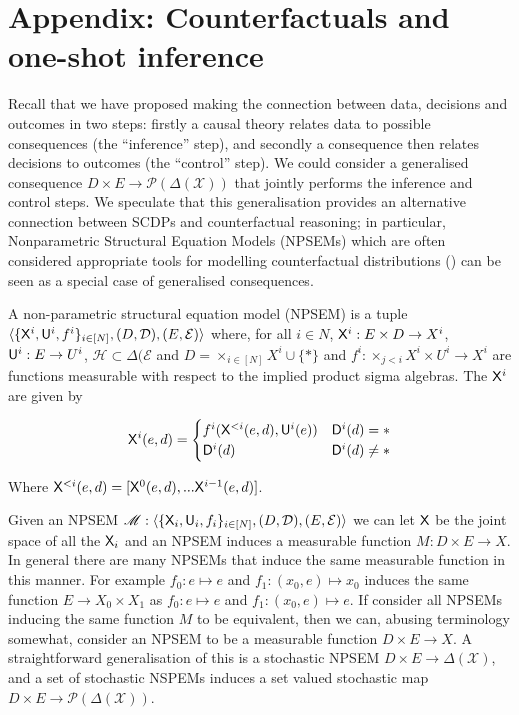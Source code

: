 \section{Appendix: Counterfactuals and one-shot inference}

Recall that we have proposed making the connection between data, decisions and outcomes in two steps: firstly a causal theory relates data to possible consequences (the ``inference'' step), and secondly a consequence then relates decisions to outcomes (the ``control'' step). We could consider a generalised consequence $D\times E\to \mathscr{P}(\Delta(\mathcal{X}))$ that jointly performs the inference and control steps. We speculate that this generalisation provides an alternative connection between SCDPs and counterfactual reasoning; in particular, Nonparametric Structural Equation Models (NPSEMs) which are often considered appropriate tools for modelling counterfactual distributions (\cite{pearl_causality:_2009,richardson2013single}) can be seen as a special case of generalised consequences.

\begin{definition}[NPSEM]\label{def:NPSEM}
A non-parametric structural equation model (NPSEM) is a tuple $\langle \{\mathsf{X}^i, \mathsf{U}^i, f^i\}_{i\in[N]}, (D,\mathcal{D}), (E,\mathcal{E})\rangle$ where, for all $i\in N$, $\mathsf{X}^i:E\times D \to X^i$, $\mathsf{U}^i:E\to U^i$, $\mathscr{H}\subset\Delta(\mathcal{E}$ and $D=\times_{i\in[N]} X^i\cup\{*\}$ and $f^i:\times_{j<i} X^i\times U^i\to X^i$ are functions measurable with respect to the implied product sigma algebras. The $\mathsf{X}^i$ are given by

\begin{align}
    \mathsf{X}^i(e,d) = \begin{cases} f^i(\mathsf{X}^{<i}(e,d),\mathsf{U}^i(e)) &\mathsf{D}^i(d)=*\\ 
    \mathsf{D}^i(d)  &\mathsf{D}^i(d)\neq * \end{cases}
\end{align}

Where $\mathsf{X}^{<i}(e,d)=[\mathsf{X}^0(e,d),...\mathsf{X}^{i-1}(e,d)]$.
\end{definition}

Given an NPSEM $\mathscr{M}:\langle \{\mathsf{X}_i, \mathsf{U}_i, f_i\}_{i\in[N]}, (D,\mathcal{D}), (E,\mathcal{E})\rangle$ we can let $\mathsf{X}$ be the joint space of all the $\mathsf{X}_i$ and an NPSEM induces a measurable function $M:D\times E\to X$. In general there are many NPSEMs that induce the same measurable function in this manner. For example $f_0:e\mapsto e$ and $f_1:(x_0,e)\mapsto x_0$ induces the same function $E\to X_0\times X_1$ as $f_0:e\mapsto e$ and $f_1:(x_0,e)\mapsto e$. If consider all NPSEMs inducing the same function $M$ to be equivalent, then we can, abusing terminology somewhat, consider an NPSEM to be a measurable function $D\times E\to X$. A straightforward generalisation of this is a stochastic NPSEM $D\times E\to \Delta(\mathscr{X})$, and a set of stochastic NSPEMs induces a set valued stochastic map $D\times E\to \mathscr{P}(\Delta(\mathcal{X}))$.



